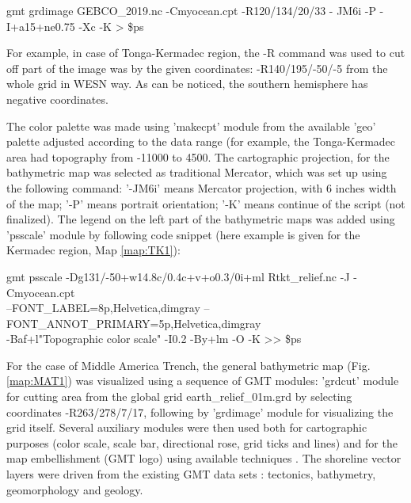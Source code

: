 \documentclass[11pt,a4paper]{report}
\begin{document}
{gmt grdimage GEBCO\_2019.nc -Cmyocean.cpt -R120/134/20/33 - JM6i -P -I+a15+ne0.75 -Xc -K > \$ps 

For example, in case of Tonga-Kermadec region, the -R command was used to cut off  part of the image was by the given coordinates: -R140/195/-50/-5 from the whole grid in WESN way. As can be noticed, the southern hemisphere has negative coordinates. 

The color palette was made using 'makecpt' module from the available 'geo' palette adjusted according to the data range (for example, the Tonga-Kermadec area had topography from -11000 to 4500. The cartographic projection, for the bathymetric map was selected as traditional Mercator, which was set up using the following command: '-JM6i' means Mercator projection, with 6 inches width of the map; '-P' means portrait orientation; '-K' means continue of the script (not finalized). The legend on the left part of the bathymetric maps was added using 'psscale' module by following code snippet (here example is given for the Kermadec region, Map \ref{map:TK1}): 

gmt psscale -Dg131/-50+w14.8c/0.4c+v+o0.3/0i+ml Rtkt\_relief.nc -J -Cmyocean.cpt \\
--FONT\_LABEL=8p,Helvetica,dimgray --FONT\_ANNOT\_PRIMARY=5p,Helvetica,dimgray \\
-Baf+l"Topographic color scale" -I0.2 -By+lm -O -K >> \$ps 

For the case of Middle America Trench, the general bathymetric map (Fig. \ref{map:MAT1}) was visualized using a sequence of \ac{GMT} modules: 'grdcut' module for cutting area from the global grid earth\_relief\_01m.grd by selecting coordinates -R263/278/7/17, following by 'grdimage' module for visualizing the grid itself. Several auxiliary modules were then used both for cartographic purposes (color scale, scale bar, directional rose, grid ticks and lines) and for the map embellishment (\ac{GMT} logo) using available techniques \cite{SmithSandwell1997a}. The shoreline vector layers were driven from the existing GMT data sets \cite{WesselSmith1996}: tectonics, bathymetry, geomorphology and geology. 

}
\end{document}
